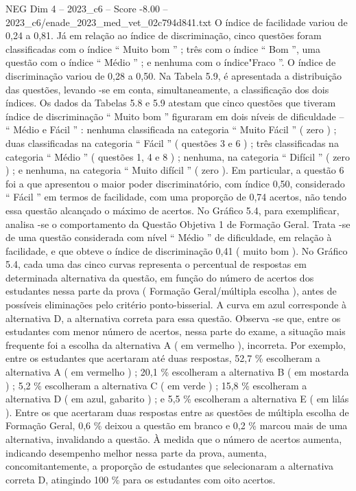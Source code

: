 \begin{textsample}{NEG Dim 4 – 2023\_c6 – Score -8.00 – 2023\_c6/enade\_2023\_med\_vet\_02c794d841.txt}
O índice de facilidade variou de 0,24 a 0,81.
Já em relação ao índice de discriminação, cinco questões foram classificadas com o índice “ Muito bom ” ; três com o índice “ Bom ”, uma questão com o índice “ Médio ” ; e nenhuma com o índice"Fraco ”.
O índice de discriminação variou de 0,28 a 0,50.
Na Tabela 5.9, é apresentada a distribuição das questões, levando -se em conta, simultaneamente, a classificação dos dois índices.
Os dados da Tabelas 5.8 e 5.9 atestam que cinco questões que tiveram índice de discriminação “ Muito bom ” figuraram em dois níveis de dificuldade – “ Médio e Fácil ” : nenhuma classificada na categoria “ Muito Fácil ” ( zero ) ; duas classificadas na categoria “ Fácil ” ( questões 3 e 6 ) ; três classificadas na categoria “ Médio ” ( questões 1, 4 e 8 ) ; nenhuma, na categoria “ Difícil ” ( zero ) ; e nenhuma, na categoria “ Muito difícil ” ( zero ).
Em particular, a questão 6 foi a que apresentou o maior poder discriminatório, com índice 0,50, considerado “ Fácil ” em termos de facilidade, com uma proporção de 0,74 acertos, não tendo essa questão alcançado o máximo de acertos.
No Gráfico 5.4, para exemplificar, analisa -se o comportamento da Questão Objetiva 1 de Formação Geral.
Trata -se de uma questão considerada com nível “ Médio ” de dificuldade, em relação à facilidade, e que obteve o índice de discriminação 0,41 ( muito bom ).
No Gráfico 5.4, cada uma das cinco curvas representa o percentual de respostas em determinada alternativa da questão, em função do número de acertos dos estudantes nessa parte da prova ( Formação Geral/múltipla escolha ), antes de possíveis eliminações pelo critério ponto-bisserial.
A curva em azul corresponde à alternativa D, a alternativa correta para essa questão.
Observa -se que, entre os estudantes com menor número de acertos, nessa parte do exame, a situação mais frequente foi a escolha da alternativa A ( em vermelho ), incorreta.
Por exemplo, entre os estudantes que acertaram até duas respostas, 52,7 \% escolheram a alternativa A ( em vermelho ) ; 20,1 \% escolheram a alternativa B ( em mostarda ) ; 5,2 \% escolheram a alternativa C ( em verde ) ; 15,8 \% escolheram a alternativa D ( em azul, gabarito ) ; e 5,5 \% escolheram a alternativa E ( em lilás ).
Entre os que acertaram duas respostas entre as questões de múltipla escolha de Formação Geral, 0,6 \% deixou a questão em branco e 0,2 \% marcou mais de uma alternativa, invalidando a questão.
À medida que o número de acertos aumenta, indicando desempenho melhor nessa parte da prova, aumenta, concomitantemente, a proporção de estudantes que selecionaram a alternativa correta D, atingindo 100 \% para os estudantes com oito acertos.

\end{textsample}
